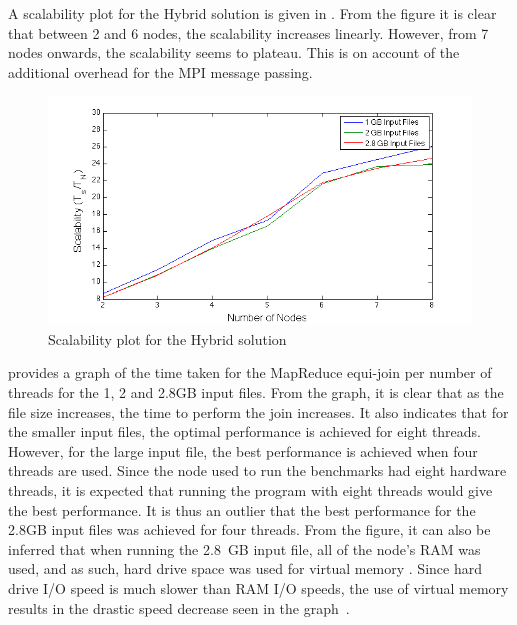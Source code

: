 \documentclass[12pt,twocolumn]{witseiepaper}
\begin{document}
A scalability plot for the Hybrid solution is given in . From the figure it is clear that between 2 and 6 nodes, the scalability increases linearly. However, from 7 nodes onwards, the scalability seems to plateau. This is on account of the additional overhead for the MPI message passing.

\begin{figure}[h]
	\centering
	\includegraphics[width=1\columnwidth]{scalability.png}
	\caption{Scalability plot for the Hybrid solution}
	\raggedright
	\label{fig:scalabilty}	
\end{figure}

 provides a graph of the time taken for the MapReduce equi-join per number of threads for the 1, 2 and 2.8GB input files. From the graph, it is clear that as the file size increases, the time to perform the join increases. It also indicates that for the smaller input files, the optimal performance is achieved for eight threads. However, for the large input file, the best performance is achieved when four threads are used. Since the node used to run the benchmarks had eight hardware threads, it is expected that running the program with eight threads would give the best performance. It is thus an outlier that the best performance for the 2.8GB input files was achieved for four threads. From the figure, it can also be inferred that when running the 2.8~GB input file, all of the node's RAM was used, and as such, hard drive space was used for virtual memory \cite{ram}. Since hard drive I/O speed is much slower than RAM I/O speeds, the use of virtual memory results in the drastic speed decrease seen in the graph~\cite{ram}.
\end{document}

